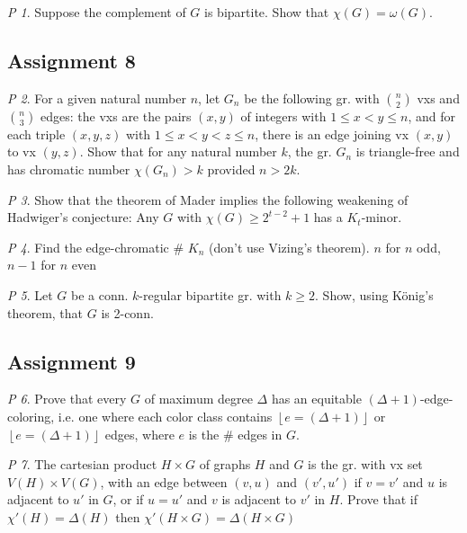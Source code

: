 \documentclass[11pt, fleqn, a4paper, landscape]{article}
\theoremstyle{plain} %
\theoremstyle{remark} %
\newtheorem{problem}{P}
\theoremstyle{definition} %
\begin{document}
\begin{multicols}{5}
\begin{problem}
Suppose the complement of $G$ is bipartite. Show that $\chi(G) = \omega(G).$
\end{problem}

\subsection{Assignment 8}

\begin{problem}
For a given natural number $n$, let $G_n$ be the following gr. with $\binom{n}{2}$ vxs and $\binom{n}{3}$ edges: the vxs are the pairs $(x, y)$ of integers with $1\le x < y \le n$, and for each triple $(x, y, z)$ with $1\le x < y < z\le n$, there is an edge joining vx $(x, y)$ to vx $(y, z)$. Show that for any natural number $k$, the gr. $G_n$ is triangle-free and has chromatic number $\chi(G_n) > k$ provided $n > 2k$.
\end{problem}

\begin{problem}
Show that the theorem of Mader implies the following weakening of Hadwiger's
conjecture: Any $G$ with $\chi(G) \ge 2^{t-2} + 1$ has a $K_t$-minor.
\end{problem}

\begin{problem}
Find the edge-chromatic \# $K_n$ (don't use Vizing's theorem). $n$ for $n$ odd, $n-1$ for $n$ even
\end{problem}

\begin{problem}
Let $G$ be a conn. $k$-regular bipartite gr. with $k\ge 2$. Show, using König's theorem, that $G$ is 2-conn.
\end{problem}

\subsection{Assignment 9}

\begin{problem}
Prove that every $G$ of maximum degree $\Delta$ has an equitable $(\Delta + 1)$-edge-coloring, i.e. one where each color class contains $\left\lfloor e=(\Delta + 1)\right\rfloor$ or $\left\lfloor e=(\Delta + 1)\right\rfloor$ edges, where $e$ is the \# edges in $G$.
\end{problem}

\begin{problem}
The cartesian product $H \times G $ of graphs $H$ and $G$ is the gr. with vx set $V (H)\times V (G)$, with an edge between $(v, u)$ and $(v', u')$ if $v = v'$ and $u$ is adjacent to $u'$ in $G$, or
if $u = u'$ and $v$ is adjacent to $v'$ in $H$. Prove that if $\chi'(H) = \Delta(H)$ then $\chi'(H\times G) = \Delta(H\times G)$
\end{problem}


\end{multicols}
\end{document}
